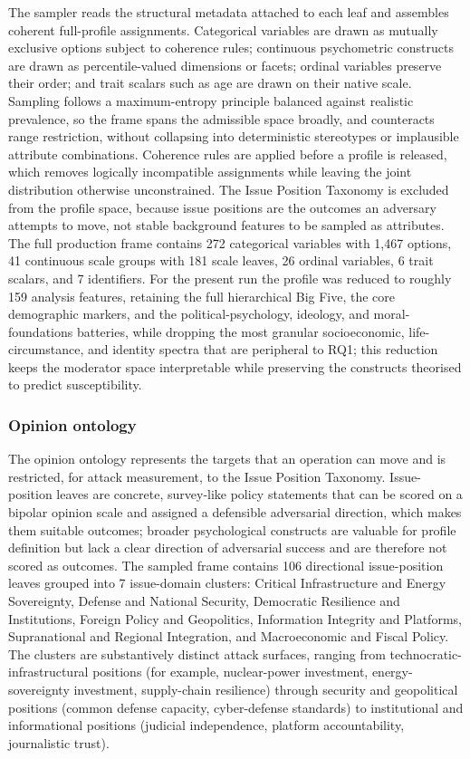 \documentclass[11pt,a4paper]{article}
\begin{document}
The sampler reads the structural metadata attached to each leaf and assembles coherent
full-profile assignments. Categorical variables are drawn as mutually exclusive options subject
to coherence rules; continuous psychometric constructs are drawn as percentile-valued dimensions
or facets; ordinal variables preserve their order; and trait scalars such as age are drawn on
their native scale. Sampling follows a maximum-entropy principle balanced against realistic
prevalence, so the frame spans the admissible space broadly, and counteracts range restriction,
without collapsing into deterministic stereotypes or implausible attribute combinations.
Coherence rules are applied before a profile is released, which removes logically incompatible
assignments while leaving the joint distribution otherwise unconstrained. The Issue Position
Taxonomy is excluded from the profile space, because issue positions are the outcomes an
adversary attempts to move, not stable background features to be sampled as attributes. The full
production frame contains 272 categorical variables with 1,467 options, 41 continuous scale
groups with 181 scale leaves, 26 ordinal variables, 6 trait scalars, and 7 identifiers. For the
present run the profile was reduced to roughly 159 analysis features, retaining the full
hierarchical Big Five, the core demographic markers, and the political-psychology, ideology, and
moral-foundations batteries, while dropping the most granular socioeconomic, life-circumstance,
and identity spectra that are peripheral to RQ1; this reduction keeps the moderator space
interpretable while preserving the constructs theorised to predict susceptibility.

\subsubsection{Opinion ontology}

The opinion ontology represents the targets that an operation can move and is restricted, for
attack measurement, to the Issue Position Taxonomy. Issue-position leaves are concrete,
survey-like policy statements that can be scored on a bipolar opinion scale and assigned a
defensible adversarial direction, which makes them suitable outcomes; broader psychological
constructs are valuable for profile definition but lack a clear direction of adversarial
success and are therefore not scored as outcomes. The sampled frame contains 106 directional
issue-position leaves grouped into 7 issue-domain clusters: Critical Infrastructure and Energy
Sovereignty, Defense and National Security, Democratic Resilience and Institutions, Foreign
Policy and Geopolitics, Information Integrity and Platforms, Supranational and Regional
Integration, and Macroeconomic and Fiscal Policy. The clusters are substantively distinct
attack surfaces, ranging from technocratic-infrastructural positions (for example, nuclear-power
investment, energy-sovereignty investment, supply-chain resilience) through security and
geopolitical positions (common defense capacity, cyber-defense standards) to institutional and
informational positions (judicial independence, platform accountability, journalistic trust).
\end{document}

